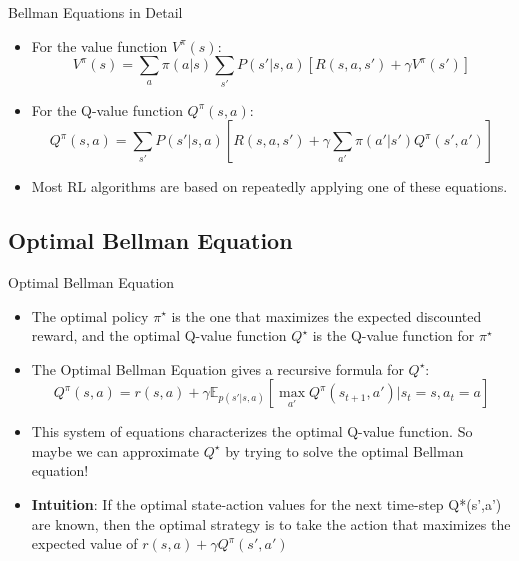 \begin{frame}{Bellman Equations in Detail}
\begin{itemize}
    \item For the value function $V^{\pi}(s)$:
    $$
    V^{\pi}(s) = \sum_{a} \pi(a|s) \sum_{s'} P(s'|s,a) \left[ R(s,a,s') + \gamma V^{\pi}(s') \right]
    $$
    \item For the Q-value function $Q^{\pi}(s,a)$:
    $$
    Q^{\pi}(s,a) = \sum_{s'} P(s'|s,a) \left[ R(s,a,s') + \gamma \sum_{a'} \pi(a'|s') Q^{\pi}(s',a') \right]
    $$
    \item Most RL algorithms are based on repeatedly applying one of these equations.
\end{itemize}
\end{frame}

\subsection{Optimal Bellman Equation}
\begin{frame}{Optimal Bellman Equation}
\begin{itemize}
    \item The optimal policy $\pi^{\star}$ is the one that maximizes the expected discounted reward, and the optimal Q-value function $Q^{\star}$ is the Q-value function for $\pi^{\star}$
    \item The Optimal Bellman Equation gives a recursive formula for $Q^{\star}$:
    $$Q^{\pi}(s,a) =  r(s,a) + \gamma \mathbb{E}_{p(s'|s, a)}\left [\max_{a'} Q^{\pi}(s_{t+1},a') | s_t=s, a_t=a \right ]$$
    \item This system of equations characterizes the optimal Q-value function. So maybe we can approximate $Q^{\star}$  by trying to solve the optimal Bellman equation!
    \item \textbf{Intuition}: If the optimal state-action values for the next time-step Q*(s',a') are known, then the optimal strategy is to take the action that maximizes the expected value of $r(s,a) + \gamma Q^{\pi}(s',a')$
\end{itemize}
\end{frame}